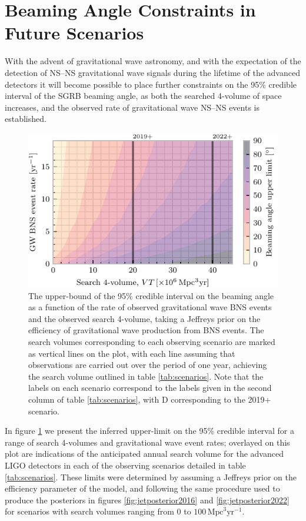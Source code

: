 \documentclass[twocolumn,nofootinbib]{revtex4-1}
\newcommand{\mpc}{\mathrm{Mpc}}
\newcommand{\yr}{\mathrm{yr}}
\newcommand{\BNS}{\ac{NS}--\ac{NS}\xspace}
\begin{document}
\section{Beaming Angle Constraints in Future Scenarios}
\label{sec:future}
With the advent of gravitational wave astronomy, and with the
expectation of the detection of \BNS gravitational wave signals during
the lifetime of the advanced detectors it will become possible to
place further constraints on the 95\% credible interval of the SGRB
beaming angle, as both the searched 4-volume of space increases, and
the observed rate of gravitational wave \BNS events is established.

\begin{figure}
\centering
\includegraphics[width=\linewidth]{volume_v_nevents.pdf}
\caption{\label{fig:volumevevents} The upper-bound of the 95\%
  credible interval on the beaming angle as a function of the rate of
  observed gravitational wave BNS events and the observed search
  4-volume, taking a Jeffreys prior on the efficiency of gravitational
  wave production from BNS events. The search volumes corresponding to
  each observing scenario are marked as vertical lines on the plot,
  with each line assuming that observations are carried out over the
  period of one year, achieving the search volume outlined in table
  \ref{tab:scenarios}. Note that the labels on each scenario
  correspond to the labels given in the second column of table
  \ref{tab:scenarios}, with D corresponding to the 2019+ scenario.}
\end{figure}

In figure \ref{fig:volumevevents} we present the inferred upper-limit
on the 95\% credible interval for a range of search 4-volumes and
gravitational wave event rates; overlayed on this plot are indications
of the anticipated annual search volume for the advanced LIGO
detectors in each of the observing scenarios detailed in table
\ref{tab:scenarios}. These limits were determined by assuming a
Jeffreys prior on the efficiency parameter of the model, and following
the same procedure used to produce the posteriors in figures
\ref{fig:jetposterior2016} and \ref{fig:jetposterior2022} for scenarios with
search volumes ranging from $0$ to $100\, \mpc^3 \yr^{-1}$. 
\end{document}
